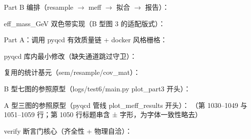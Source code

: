 \documentclass[UTF8]{ctexart}
\begin{document}
Part B 编排（resample $\to$ meff $\to$ 拟合 $\to$ 报告）：


eff\_mass\_GeV 双色带实现（B 型图 3 的适配版式）：


Part A：调用 pyqcd 有效质量链 + docker 风格栅格：


pyqcd 库内最小修改（缺失通道跳过守卫）：


复用的统计基元（sem/resample/cov\_mat）：


B 型七图的参照原型（logs/test6/main.py plot\_part3 开头）：


A 型三图的参照原型（pyqcd 管线 plot\_meff\_results 开头）：
（第 1030--1049 与 1051--1059 行；第 1050 行标题串含 ± 字形，为字体一致性略去）



verify 断言门核心（齐全性 + 物理自洽）：


\end{document}
